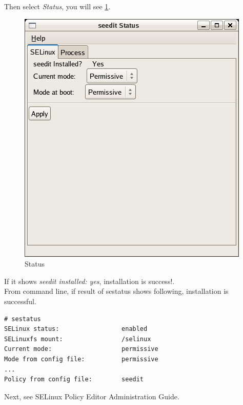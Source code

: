 \documentclass{article}
\begin{document}
Then  select {\it Status}, you will see \ref{fig:status-selinux}.
\begin{figure}
\caption{Status}\label{fig:status-selinux}
\includegraphics{images/status-selinux.png}
\end{figure}
If it shows {\it seedit installed: yes}, installation is success!.\\

From command line, if result of sestatus shows following, installation
is successful.
\begin{verbatim}
# sestatus
SELinux status:                 enabled
SELinuxfs mount:                /selinux
Current mode:                   permissive
Mode from config file:          permissive
...
Policy from config file:        seedit	
\end{verbatim}

Next,  see SELinux Policy Editor Administration Guide.
\end{document}
